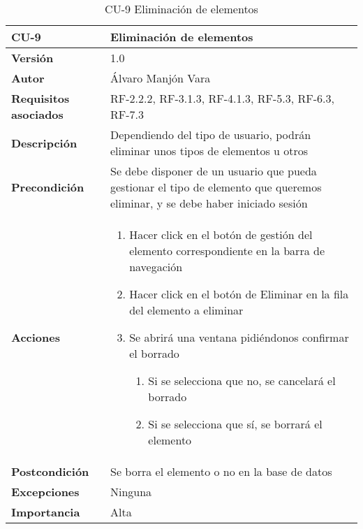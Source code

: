 \begin{table}[htp]
	\centering
	\begin{tabularx}{\linewidth}{ p{} p{} }
		\toprule
		\textbf{CU-9}    & \textbf{Eliminación de elementos}\\
		\toprule
		\textbf{Versión}              & 1.0    \\
		\textbf{Autor}                & Álvaro Manjón Vara \\
		\textbf{Requisitos asociados} & RF-2.2.2, RF-3.1.3, RF-4.1.3, RF-5.3, RF-6.3, RF-7.3 \\
		\textbf{Descripción}          & Dependiendo del tipo de usuario, podrán eliminar unos tipos de elementos u otros \\
		\textbf{Precondición}         & Se debe disponer de un usuario que pueda gestionar el tipo de elemento que queremos eliminar, y se debe haber iniciado sesión \\
		\textbf{Acciones}             &
		\begin{enumerate}
			\def\labelenumi{\arabic{enumi}.}
			\tightlist
			\item Hacer click en el botón de gestión del elemento correspondiente en la barra de navegación
			\item Hacer click en el botón de Eliminar en la fila del elemento a eliminar
			\item Se abrirá una ventana pidiéndonos confirmar el borrado
			\begin{enumerate}
				\item Si se selecciona que no, se cancelará el borrado
				\item Si se selecciona que sí, se borrará el elemento
			\end{enumerate}
		\end{enumerate}\\
		\textbf{Postcondición}        & Se borra el elemento o no en la base de datos \\
		\textbf{Excepciones}          & Ninguna
 \\
		\textbf{Importancia}          & Alta \\
		\bottomrule
	\end{tabularx}
	\caption{CU-9 Eliminación de elementos}
\end{table}
\afterpage{\clearpage}

